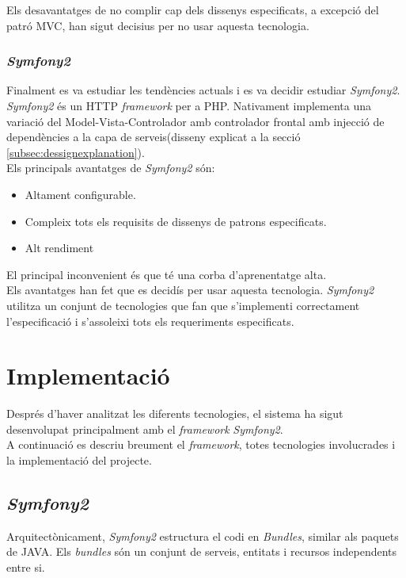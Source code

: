 Els desavantatges de no complir cap dels dissenys especificats, a excepció del patró MVC, han sigut decisius per no usar aquesta tecnologia.

\subsubsection{\textit{Symfony2}}
Finalment es va estudiar les tendències actuals i es va decidir estudiar \textit{Symfony2}.\cite{symfony} \textit{Symfony2} \'{e}s un HTTP \textit{framework} per a PHP. Nativament implementa una variaci\'{o} del Model-Vista-Controlador amb controlador frontal amb injecci\'{o} de dependències a la capa de serveis(disseny explicat a la secció \ref{subsec:dessignexplanation}).\\

Els principals avantatges de \textit{Symfony2} s\'{o}n:
\begin{itemize}
\item Altament configurable.
\item Compleix tots els requisits de dissenys de patrons especificats.
\item Alt rendiment
\end{itemize}

El principal inconvenient \'{e}s que t\'{e} una corba d'aprenentatge alta.\\

Els avantatges han fet que es decidís per usar aquesta tecnologia. \textit{Symfony2} utilitza un conjunt de tecnologies que fan que s'implementi correctament l'especificació i s'assoleixi tots els requeriments especificats.\\

\section{Implementaci\'{o}}
Després d'haver analitzat les diferents tecnologies, el sistema ha sigut desenvolupat principalment amb el \textit{framework} \textit{Symfony2}.\\

A continuació es descriu breument el \textit{framework}, totes tecnologies involucrades i la implementació del projecte.

\subsection{\textit{Symfony2}}
Arquitectònicament, \textit{Symfony2} estructura el codi en \textit{Bundles}, similar als paquets de JAVA. Els \textit{bundles} s\'{o}n un conjunt de serveis, entitats i recursos independents entre si.\\

